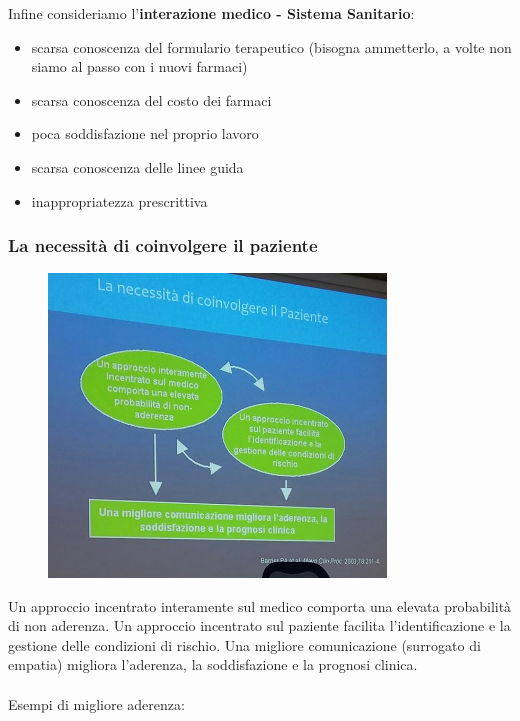 Infine consideriamo l'\textbf{interazione medico - Sistema Sanitario}:

\begin{itemize}
\item
  scarsa conoscenza del formulario terapeutico (bisogna ammetterlo, a
  volte non siamo al passo con i nuovi farmaci)
\item
  scarsa conoscenza del costo dei farmaci
\item
  poca soddisfazione nel proprio lavoro
\item
  scarsa conoscenza delle linee guida
\item
  inappropriatezza prescrittiva
\end{itemize}

\subsubsection{La necessità di coinvolgere il paziente}

\begin{figure}[!ht]
\centering
	\includegraphics[width=0.8\textwidth]{41/image7.jpeg}
	\end{figure}
	
Un approccio incentrato interamente sul medico comporta una elevata
probabilità di non aderenza. Un approccio incentrato sul paziente
facilita l'identificazione e la gestione delle condizioni di rischio.
Una migliore comunicazione (surrogato di empatia) migliora l'aderenza,
la soddisfazione e la prognosi clinica.
\\\\
Esempi di migliore aderenza:


